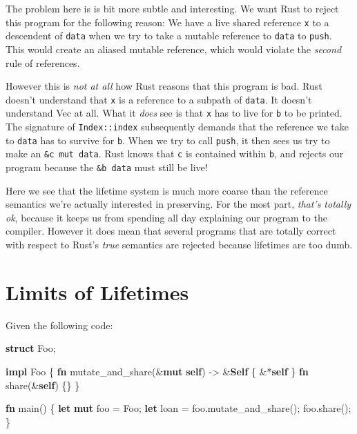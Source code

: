 \documentclass[a4paper,]{book}
\newenvironment{Shaded}{\begin{snugshade}}{\end{snugshade}}
\newcommand{\KeywordTok}[1]{\textcolor[rgb]{0.13,0.29,0.53}{\textbf{{#1}}}}
\newcommand{\NormalTok}[1]{{#1}}
\begin{document}
The problem here is is bit more subtle and interesting. We want Rust to
reject this program for the following reason: We have a live shared
reference \texttt{x} to a descendent of \texttt{data} when we try to
take a mutable reference to \texttt{data} to \texttt{push}. This would
create an aliased mutable reference, which would violate the
\emph{second} rule of references.

However this is \emph{not at all} how Rust reasons that this program is
bad. Rust doesn't understand that \texttt{x} is a reference to a subpath
of \texttt{data}. It doesn't understand Vec at all. What it \emph{does}
see is that \texttt{x} has to live for \texttt{\textquotesingle{}b} to
be printed. The signature of \texttt{Index::index} subsequently demands
that the reference we take to \texttt{data} has to survive for
\texttt{\textquotesingle{}b}. When we try to call \texttt{push}, it then
sees us try to make an \texttt{\&\textquotesingle{}c\ mut\ data}. Rust
knows that \texttt{\textquotesingle{}c} is contained within
\texttt{\textquotesingle{}b}, and rejects our program because the
\texttt{\&\textquotesingle{}b\ data} must still be live!

Here we see that the lifetime system is much more coarse than the
reference semantics we're actually interested in preserving. For the
most part, \emph{that's totally ok}, because it keeps us from spending
all day explaining our program to the compiler. However it does mean
that several programs that are totally correct with respect to Rust's
\emph{true} semantics are rejected because lifetimes are too dumb.

\section{Limits of Lifetimes}\label{sec--lifetime-mismatch}

Given the following code:

\begin{Shaded}
\begin{Highlighting}[]
\KeywordTok{struct} \NormalTok{Foo;}

\KeywordTok{impl} \NormalTok{Foo \{}
    \KeywordTok{fn} \NormalTok{mutate_and_share(&}\KeywordTok{mut} \KeywordTok{self}\NormalTok{) -> &}\KeywordTok{Self} \NormalTok{\{ &*}\KeywordTok{self} \NormalTok{\}}
    \KeywordTok{fn} \NormalTok{share(&}\KeywordTok{self}\NormalTok{) \{\}}
\NormalTok{\}}

\KeywordTok{fn} \NormalTok{main() \{}
    \KeywordTok{let} \KeywordTok{mut} \NormalTok{foo = Foo;}
    \KeywordTok{let} \NormalTok{loan = foo.mutate_and_share();}
    \NormalTok{foo.share();}
\NormalTok{\}}
\end{Highlighting}
\end{Shaded}
\end{document}

